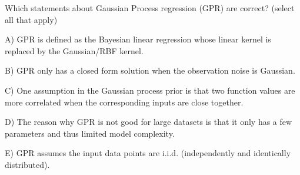 Which statements about Gaussian Process regression (GPR) are correct? (select all that apply)


A) GPR is defined as the Bayesian linear regression whose linear kernel is replaced by the Gaussian/RBF kernel.


B) GPR only has a closed form solution when the observation noise is Gaussian.


C) One assumption in the Gaussian process prior is that two function values are more correlated when the corresponding inputs are close together.


D) The reason why GPR is not good for large datasets is that it only has a few parameters and thus limited model complexity.


E) GPR assumes the input data points are i.i.d. (independently and identically distributed).

